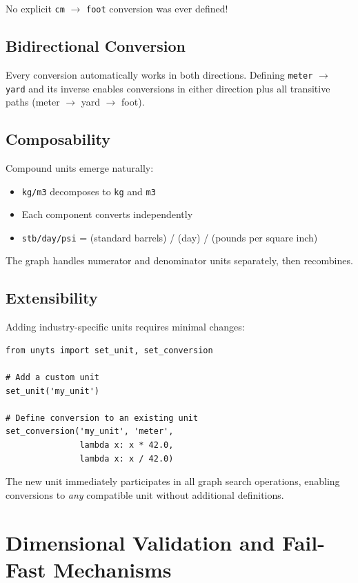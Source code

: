 \documentclass[11pt,a4paper]{report}
\begin{document}
No explicit \texttt{cm} $\rightarrow$ \texttt{foot} conversion was ever defined!

\subsection{Bidirectional Conversion}

Every conversion automatically works in both directions. Defining \texttt{meter} $\rightarrow$ \texttt{yard} and its inverse enables conversions in either direction plus all transitive paths (meter $\rightarrow$ yard $\rightarrow$ foot).

\subsection{Composability}

Compound units emerge naturally:
\begin{itemize}[leftmargin=*]
  \item \texttt{kg/m3} decomposes to \texttt{kg} and \texttt{m3}
  \item Each component converts independently
  \item \texttt{stb/day/psi} = (standard barrels) / (day) / (pounds per square inch)
\end{itemize}

The graph handles numerator and denominator units separately, then recombines.

\subsection{Extensibility}

Adding industry-specific units requires minimal changes:

\begin{lstlisting}[style=pythonstyle, caption={Adding custom units}]
from unyts import set_unit, set_conversion

# Add a custom unit
set_unit('my_unit')

# Define conversion to an existing unit
set_conversion('my_unit', 'meter', 
               lambda x: x * 42.0,
               lambda x: x / 42.0)
\end{lstlisting}

The new unit immediately participates in all graph search operations, enabling conversions to \emph{any} compatible unit without additional definitions.

\section{Dimensional Validation and Fail-Fast Mechanisms}
\end{document}
